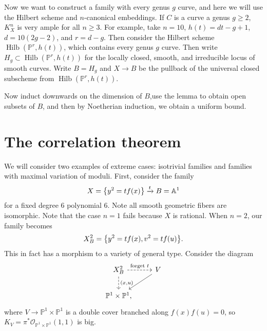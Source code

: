 \documentclass[leqno, openany]{memoir}
\theoremstyle{definition}
\theoremstyle{remark}
\theoremstyle{plain}
\theoremstyle{definition}
\theoremstyle{remark}
\newcommand{\A}{\mathbb{A}}
\renewcommand{\P}{\mathbb{P}}
\newcommand{\mc}[1]{\mathcal{#1}}
\newcommand{\on}[1]{\operatorname{#1}}
\begin{document}
Now we want to construct a family with every genus $g$ curve, and here we will use the Hilbert scheme and $n$-canonical embeddings. If $C$ is a curve a genus $g \geq 2$, $K_X^n$ is very ample for all $n \geq 3$. For example, take $n = 10$, $h(t) = dt - g + 1$, $d = 10(2g-2)$, and $r = d-g$. Then consider the Hilbert scheme $\on{Hilb}(\P^r, h(t))$, which contains every genus $g$ curve. Then write $H_g \subset \on{Hilb}(\P^r, h(t))$ for the locally closed, smooth, and irreducible locus of smooth curves. Write $B = H_g$ and $X \to B$ be the pullback of the universal closed subscheme from $\on{Hilb}(\P^r, h(t))$.

Now induct downwards on the dimension of $B$,use the lemma to obtain open subsets of $B$, and then by Noetherian induction, we obtain a uniform bound.

\section{The correlation theorem}

We will consider two examples of extreme cases: isotrivial families and families with maximal variation of moduli. First, consider the family
\[ X = \qty{y^2 = t f(x)} \xrightarrow{t} B = \A^1 \]
for a fixed degree $6$ polynomial $6$. Note all smooth geometric fibers are isomorphic. Note that the case $n=1$ fails because $X$ is rational. When $n = 2$, our family becomes
\[ X_B^2 = \qty{y^2 = tf(x), v^2 = tf(u)}. \]
This in fact has a morphism to a variety of general type. Consider the diagram
\begin{equation*}
\begin{tikzcd}
    X_B^2 \ar[dashrightarrow]{r}{\text{forget }t} \ar[dashrightarrow]{d}{(x,u)} & V \ar{dl} \\
    \P^1 \times \P^1,
\end{tikzcd}
\end{equation*}
where $V \to \P^1 \times \P^1$ is a double cover branched along $f(x) f(u) = 0$, so $K_V = \pi^* \mc{O}_{\P^1 \times \P^1}(1,1)$ is big.
\end{document}
